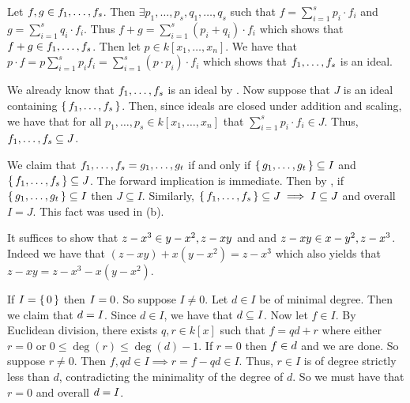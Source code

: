 \documentclass[letterpaper, 11pt, oneside]{book}
\begin{document}
\begin{sol}\label{ex:UAG_1.1.2}
  Let $f, g \in \ideal{f_{1}, \ldots, f_{s}}$.
  Then $\exists p_{1}, \ldots, p_{s}, q_{1}, \ldots, q_{s}$ such that $f = \sum_{i = 1}^{s} p_{i} \cdot f_{i}$ and $g = \sum_{i = 1}^{s} q_{i} \cdot f_{i}$.
  Thus $f + g = \sum_{i = 1}^{s} (p_{i} + q_{i}) \cdot f_{i}$ which shows that $f + g \in \ideal{f_{1}, \ldots, f_{s}}$.
  Then let $p \in k[x_{1}, \ldots, x_{n}]$.
  We have that $p \cdot f = p\sum_{i = 1}^{s} p_{i} f_{i} = \sum_{i = 1}^{s} (p \cdot p_{i}) \cdot f_{i}$ which shows that $\ideal{f_{1}, \ldots, f_{s}}$ is an ideal.
\end{sol}

\begin{sol}\label{ex:UAG_1.1.3}
  We already know that $\ideal{f_{1}, \ldots, f_{s}}$ is an ideal by .
  Now suppose that $J$ is an ideal containing $\set{f_{1}, \ldots, f_{s}}$.
  Then, since ideals are closed under addition and scaling, we have that for all $p_{1}, \ldots, p_{s} \in k[x_{1}, \ldots, x_{n}]$ that $\sum_{i = 1}^{s} p_{i} \cdot f_{i} \in J$.
  Thus, $\ideal{f_{1}, \ldots, f_{s}} \subseteq J$.
\end{sol}

\begin{sol}\label{ex:UAG_1.1.4}
  We claim that $\ideal{f_{1}, \ldots, f_{s}} = \ideal{g_{1}, \ldots, g_{t}}$ if and only if $\set{g_{1}, \ldots, g_{t}} \subseteq I$ and $\set{f_{1}, \ldots, f_{s}} \subseteq J$.
  The forward implication is immediate.
  Then by , if $\set{g_{1}, \ldots, g_{t}} \subseteq I$ then $J \subseteq I$.
  Similarly, $\set{f_{1}, \ldots, f_{s}} \subseteq J \implies I \subseteq J$ and overall $I = J$.
  This fact was used in  (b).
\end{sol}

\begin{sol}\label{ex:UAG_1.1.5}
  It suffices to show that $z - x^{3} \in \ideal{y - x^{2}, z - xy}$ and and $z - xy \in \ideal{x - y^{2}, z - x^{3}}$.
  Indeed we have that $(z - xy) + x(y - x^{2}) = z - x^{3}$ which also yields that $z - xy = z - x^{3} - x(y - x^{2})$.
\end{sol}

\begin{sol}\label{ex:UAG_1.1.6}
  If $I = \set{0}$ then $I = \ideal{0}$.
  So suppose $I \neq 0$.
  Let $d \in I$ be of minimal degree.
  Then we claim that $\ideal{d} = I$.
  Since $d \in I$, we have that $\ideal{d} \subseteq I$.
  Now let $f \in I$.
  By Euclidean division, there exists $q, r \in k[x]$ such that $f = qd + r$ where either $r = 0$ or $0 \leq \deg(r) \leq \deg(d) - 1$.
  If $r = 0$ then $f \in \ideal{d}$ and we are done.
  So suppose $r \neq 0$.
  Then $f, qd \in I \implies r = f - qd \in I$.
  Thus, $r \in I$ is of degree strictly less than $d$, contradicting the minimality of the degree of $d$.
  So we must have that $r = 0$ and overall $\ideal{d} = I$.
\end{sol}
\end{document}
